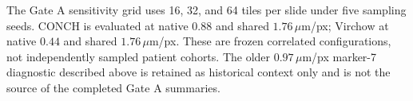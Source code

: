 The Gate A sensitivity grid uses 16, 32, and 64 tiles per slide under five sampling seeds.
CONCH is evaluated at native $0.88$ and shared $1.76\,\mu$m/px; Virchow at native $0.44$ and
shared $1.76\,\mu$m/px. These are frozen correlated configurations, not independently sampled
patient cohorts. The older $0.97\,\mu$m/px marker-7 diagnostic described above is retained as
historical context only and is not the source of the completed Gate A summaries.
